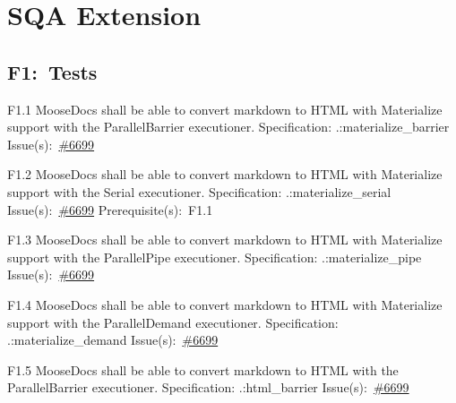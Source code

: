 
\chapter{\label{sqa-extension}SQA Extension}\section*{F1:~Tests}
\begin{Requirement}{F1.1}
MooseDocs shall be able to convert markdown to HTML with Materialize support with the ParallelBarrier executioner.
\newline
Specification: .:materialize\_barrier
\newline
Issue(s):~\href{https://github.com/idaholab/moose/issues/6699}{\#6699}
\end{Requirement}

\begin{Requirement}{F1.2}
MooseDocs shall be able to convert markdown to HTML with Materialize support with the Serial executioner.
\newline
Specification: .:materialize\_serial
\newline
Issue(s):~\href{https://github.com/idaholab/moose/issues/6699}{\#6699}
\newline
Prerequisite(s):~F1.1
\end{Requirement}

\begin{Requirement}{F1.3}
MooseDocs shall be able to convert markdown to HTML with Materialize support with the ParallelPipe executioner.
\newline
Specification: .:materialize\_pipe
\newline
Issue(s):~\href{https://github.com/idaholab/moose/issues/6699}{\#6699}
\end{Requirement}

\begin{Requirement}{F1.4}
MooseDocs shall be able to convert markdown to HTML with Materialize support with the ParallelDemand executioner.
\newline
Specification: .:materialize\_demand
\newline
Issue(s):~\href{https://github.com/idaholab/moose/issues/6699}{\#6699}
\end{Requirement}

\begin{Requirement}{F1.5}
MooseDocs shall be able to convert markdown to HTML with the ParallelBarrier executioner.
\newline
Specification: .:html\_barrier
\newline
Issue(s):~\href{https://github.com/idaholab/moose/issues/6699}{\#6699}
\end{Requirement}

